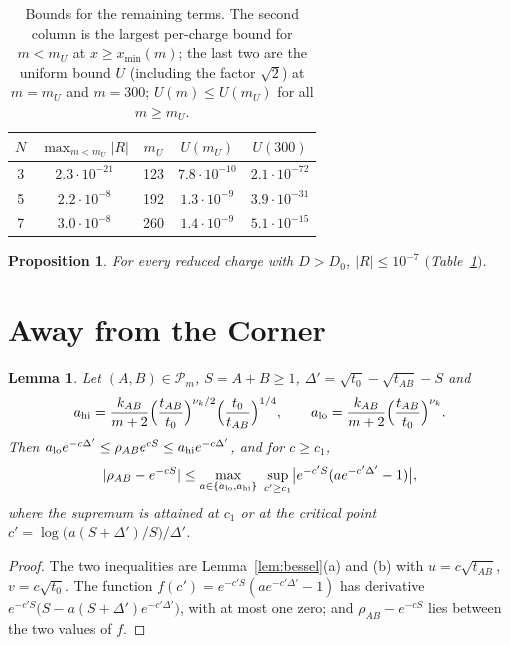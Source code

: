 \documentclass[11pt]{amsart}
\numberwithin{equation}{section}
\theoremstyle{plain}
\newtheorem{lem}[thm]{Lemma}
\newtheorem{prop}[thm]{Proposition}
\theoremstyle{definition}
\theoremstyle{remark}
\newcommand{\ERRthree}{$2.3\cdot10^{-21}$}\newcommand{\ERRfive}{$2.2\cdot10^{-8}$}\newcommand{\ERRseven}{$3.0\cdot10^{-8}$}
\newcommand{\UthreeA}{$7.8\cdot10^{-10}$}\newcommand{\UthreeB}{$2.1\cdot10^{-72}$}\newcommand{\UfiveA}{$1.3\cdot10^{-9}$}\newcommand{\UfiveB}{$3.9\cdot10^{-31}$}\newcommand{\UsevenA}{$1.4\cdot10^{-9}$}\newcommand{\UsevenB}{$5.1\cdot10^{-15}$}
\begin{document}
\begin{table}[t]
\centering
\caption{Bounds for the remaining terms. The second column is the largest per-charge bound for $m<m_U$ at $x\ge x_{\min}(m)$; the last two are the uniform bound $U$ (including the factor $\sqrt2$) at $m=m_U$ and $m=300$; $U(m)\le U(m_U)$ for all $m\ge m_U$.}
\label{tab:err}
\begin{tabular}{ccccc}
\toprule
$N$&$\max_{m<m_U}|R|$&$m_U$&$U(m_U)$&$U(300)$\\
\midrule
3&\ERRthree&123&\UthreeA&\UthreeB\\
5&\ERRfive&192&\UfiveA&\UfiveB\\
7&\ERRseven&260&\UsevenA&\UsevenB\\
\bottomrule
\end{tabular}
\end{table}

\begin{prop}\label{prop:R}
For every reduced charge with $D>D_0$, $|R|\le10^{-7}$ $($Table~\ref{tab:err}$)$.
\end{prop}

\section{Away from the Corner}\label{sec:away}

\begin{lem}\label{lem:termwise}
Let $(A,B)\in\mathcal P_m$, $S=A+B\ge1$, $\Delta'=\sqrt{t_0}-\sqrt{t_{AB}}-S$ and
\[
a_{\rm hi}=\frac{k_{AB}}{m+2}\Bigl(\frac{t_{AB}}{t_0}\Bigr)^{\nu_k/2}\Bigl(\frac{t_0}{t_{AB}}\Bigr)^{1/4},\qquad a_{\rm lo}=\frac{k_{AB}}{m+2}\Bigl(\frac{t_{AB}}{t_0}\Bigr)^{\nu_k}.
\]
Then $a_{\rm lo}e^{-c\Delta'}\le\rho_{AB}e^{cS}\le a_{\rm hi}e^{-c\Delta'}$, and for $c\ge c_1$,
\[
|\rho_{AB}-e^{-cS}|\le\max_{a\in\{a_{\rm lo},a_{\rm hi}\}}\ \sup_{c'\ge c_1}\bigl|e^{-c'S}(ae^{-c'\Delta'}-1)\bigr|,
\]
where the supremum is attained at $c_1$ or at the critical point $c'=\log\bigl(a(S+\Delta')/S\bigr)/\Delta'$.
\end{lem}

\begin{proof}
The two inequalities are Lemma~\ref{lem:bessel}(a) and (b) with $u=c\sqrt{t_{AB}}$, $v=c\sqrt{t_0}$. The function $f(c')=e^{-c'S}(ae^{-c'\Delta'}-1)$ has derivative $e^{-c'S}\bigl(S-a(S+\Delta')e^{-c'\Delta'}\bigr)$, with at most one zero; and $\rho_{AB}-e^{-cS}$ lies between the two values of $f$.
\end{proof}
\end{document}
